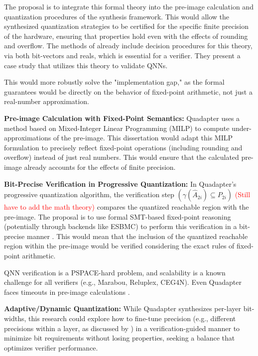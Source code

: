 The proposal is to integrate this formal theory into the pre-image calculation and quantization procedures of the synthesis framework. This would allow the synthesized quantization strategies to be certified for the specific finite precision of the hardware, ensuring that properties hold even with the effects of rounding and overflow. The methods of \cite{baranowski2020smt} already include decision procedures for this theory, via both bit-vectors and reals, which is essential for a verifier. They present a case study that utilizes this theory to validate QNNs.

This would more robustly solve the "implementation gap," as the formal guarantees would be directly on the behavior of fixed-point arithmetic, not just a real-number approximation.

\textbf{Pre-image Calculation with Fixed-Point Semantics:}
Quadapter uses a method based on Mixed-Integer Linear Programming (MILP) to compute under-approximations of the pre-image. This dissertation would adapt this MILP formulation to precisely reflect fixed-point operations (including rounding and overflow) instead of just real numbers. This would ensure that the calculated pre-image already accounts for the effects of finite precision.

\textbf{Bit-Precise Verification in Progressive Quantization:}
In Quadapter's progressive quantization algorithm, the verification step $\left(\gamma(\hat{A}_{2i}) \subseteq P_{2i}\right)$ \textcolor{red}{(Still have to add the math theory)} compares the quantized reachable region with the pre-image. The proposal is to use formal SMT-based fixed-point reasoning (potentially through backends like ESBMC) to perform this verification in a bit-precise manner \cite{esbmc2025}. This would mean that the inclusion of the quantized reachable region within the pre-image would be verified considering the exact rules of fixed-point arithmetic.

QNN verification is a PSPACE-hard problem, and scalability is a known challenge for all verifiers (e.g., Marabou, Reluplex, CEG4N). Even Quadapter faces timeouts in pre-image calculations \cite{cai2025certified}.

\textbf{Adaptive/Dynamic Quantization:} While Quadapter synthesizes per-layer bit-widths, this research could explore how to fine-tune precision (e.g., different precisions within a layer, as discussed by \cite{han2020understanding,abdi2021counterexample}) in a verification-guided manner to minimize bit requirements without losing properties, seeking a balance that optimizes verifier performance.


